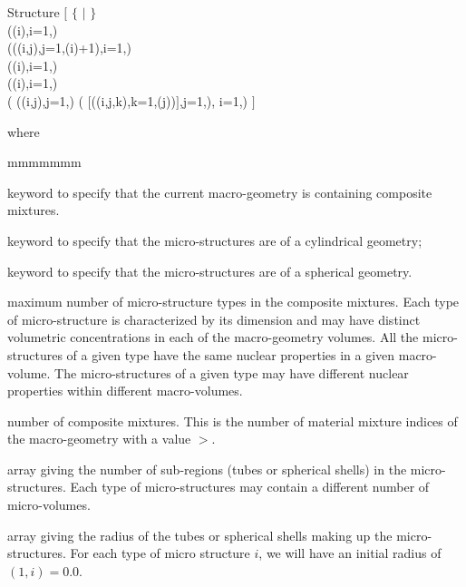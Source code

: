 \begin{DataStructure}{Structure }
$[$   $\{$  $|$  $\}$ 
 \\
\hskip 1.0cm ((i),i=1,) \\
\hskip 1.0cm(((i,j),j=1,(i)+1),i=1,)\\
\hskip 1.0cm((i),i=1,)\\
\hskip 1.0cm((i),i=1,)\\
\hskip 1.0cm( ((i,j),j=1,) 
( $[$((i,j,k),k=1,(j))$]$,j=1,), i=1,) $]$
\end{DataStructure}

\noindent where
\begin{ListeDeDescription}{mmmmmmm}

\item[\moc{BIHET}] keyword to specify that the current macro-geometry is containing composite mixtures.

\item[\moc{TUBE}] keyword to specify that the micro-structures are of a
cylindrical geometry;

\item[\moc{SPHE}] keyword to specify that the micro-structures are of a
spherical geometry.

\item[\dusa{nmistr}] maximum number of micro-structure types in the composite mixtures. Each type of
micro-structure is characterized by its dimension and may have distinct
volumetric concentrations in each of the macro-geometry volumes. All the
micro-structures of a given type have the same nuclear properties in a given
macro-volume. The micro-structures of a given type may have different nuclear
properties within different macro-volumes.

\item[\dusa{nmilg}] number of composite mixtures. This is the number of material mixture indices of the macro-geometry with a value $>$.

\item[\dusa{ns}] array giving the number of sub-regions (tubes or spherical
shells) in the  micro-structures. Each type of micro-structures may contain a
different number of micro-volumes.

\item[\dusa{rs}] array giving the radius of the tubes or spherical shells
making up the micro-structures. For each type of micro structure $i$, we will
have an initial radius of $(1,i)=0.0$.


\end{ListeDeDescription}
